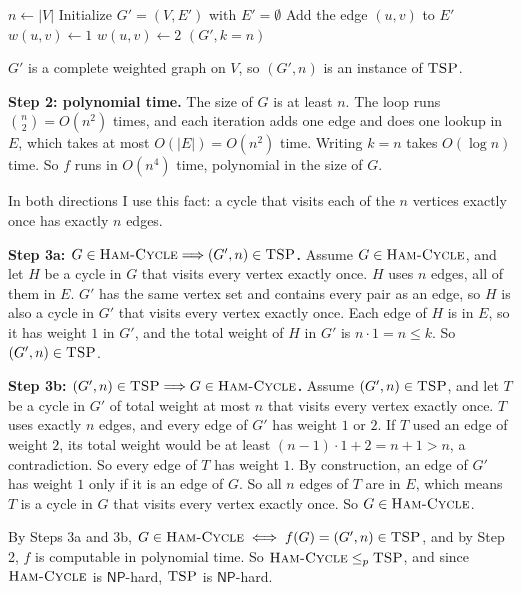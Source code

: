 \documentclass[11pt]{article}
\newcommand{\abs}[1]{\left|#1\right|}
\newcommand{\lp}{\leq_p}
\newcommand{\cproblem}[1]{\textsc{#1}}
\newcommand{\NP}{\textsf{NP}}
\newcommand{\TSP}{\cproblem{TSP}}
\newcommand{\HC}{\cproblem{Ham-Cycle}}
\begin{document}
\begin{algorithmic}[1]
    \State $n \gets \abs{V}$
    \State Initialize $G' = (V, E')$ with $E' = \emptyset$
      \State Add the edge $(u, v)$ to $E'$
       $w(u, v) \gets 1$
      \Else{} $w(u, v) \gets 2$
      \EndIf
    \EndFor
    \State \Return $(G', k = n)$
  \EndFunction
\end{algorithmic}

$G'$ is a complete weighted graph on $V$, so $(G', n)$ is an instance of $\TSP$.

\textbf{Step 2: polynomial time.}
The size of $G$ is at least $n$.
The loop runs $\binom{n}{2} = O(n^2)$ times, and each iteration adds one edge and does one lookup in $E$, which takes at most $O(\abs{E}) = O(n^2)$ time.
Writing $k = n$ takes $O(\log n)$ time.
So $f$ runs in $O(n^4)$ time, polynomial in the size of $G$.

In both directions I use this fact: a cycle that visits each of the $n$ vertices exactly once has exactly $n$ edges.

\textbf{Step 3a: $G \in \HC \Longrightarrow (G', n) \in \TSP$.}
Assume $G \in \HC$, and let $H$ be a cycle in $G$ that visits every vertex exactly once.
$H$ uses $n$ edges, all of them in $E$.
$G'$ has the same vertex set and contains every pair as an edge, so $H$ is also a cycle in $G'$ that visits every vertex exactly once.
Each edge of $H$ is in $E$, so it has weight $1$ in $G'$, and the total weight of $H$ in $G'$ is $n \cdot 1 = n \leq k$.
So $(G', n) \in \TSP$.

\textbf{Step 3b: $(G', n) \in \TSP \Longrightarrow G \in \HC$.}
Assume $(G', n) \in \TSP$, and let $T$ be a cycle in $G'$ of total weight at most $n$ that visits every vertex exactly once.
$T$ uses exactly $n$ edges, and every edge of $G'$ has weight $1$ or $2$.
If $T$ used an edge of weight $2$, its total weight would be at least $(n - 1) \cdot 1 + 2 = n + 1 > n$, a contradiction.
So every edge of $T$ has weight $1$.
By construction, an edge of $G'$ has weight $1$ only if it is an edge of $G$.
So all $n$ edges of $T$ are in $E$, which means $T$ is a cycle in $G$ that visits every vertex exactly once.
So $G \in \HC$.

By Steps 3a and 3b, $G \in \HC \iff f(G) = (G', n) \in \TSP$, and by Step 2, $f$ is computable in polynomial time.
So $\HC \lp \TSP$, and since $\HC$ is $\NP$-hard, $\TSP$ is $\NP$-hard.
\end{document}
